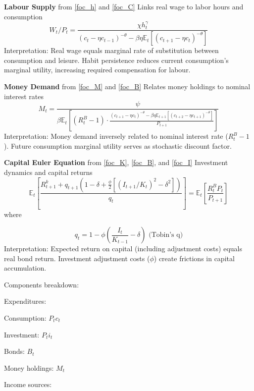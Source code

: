 \documentclass[11pt,preprint]{elsarticle}
\numberwithin{equation}{section}
\numberwithin{figure}{section}
\numberwithin{table}{section}
\begin{document}
\textbf{Labour Supply} from \ref{foc_h} and \ref{foc_C} Links real wage
to labor hours and consumption \begin{equation}\label{reduced_h}
W_t / P_t = \frac{\chi h_t^{\gamma}}
                   {(c_t - \eta c_{t-1})^{-\theta} - \beta\eta \mathbb{E}_t[(c_{t+1} - \eta c_t)^{-\theta}]}
\end{equation} Interpretation: Real wage equals marginal rate of
substitution between consumption and leisure. Habit persistence reduces
current consumption's marginal utility, increasing required compensation
for labour.

\textbf{Money Demand} from \ref{foc_M} and \ref{foc_B} Relates money
holdings to nominal interest rates \begin{equation}\label{reduced_M}
M_t = \frac{\psi}
             {\beta \mathbb{E}_t \left[ (R^B_t - 1) \cdot \frac{(c_{t+1} - \eta c_t)^{-\theta} - \beta\eta \mathbb{E}_{t+1}[(c_{t+2} - \eta c_{t+1})^{-\theta}]}{P_{t+1}} \right]}
\end{equation} Interpretation: Money demand inversely related to nominal
interest rate (\(R^B_t - 1\)). Future consumption marginal utility
serves as stochastic discount factor.

\textbf{Capital Euler Equation} from \ref{foc_K}, \ref{foc_B}, and
\ref{foc_I} Investment dynamics and capital returns
\begin{equation}\label{reduced_K}
\mathbb{E}_t \left[ \frac{R^k_{t+1} + q_{t+1}(1-\delta + \tfrac{\phi}{2}[(I_{t+1}/K_t)^2 - \delta^2])}
                   {q_t} \right]
= \mathbb{E}_t \left[ \frac{R^B_t P_t}{P_{t+1}} \right]
\end{equation} where

\begin{equation}
q_t = 1 - \phi \left( \frac{I_t}{K_{t-1}} - \delta \right)
\text{ (Tobin's q)}
\end{equation} Interpretation: Expected return on capital (including
adjustment costs) equals real bond return. Investment adjustment costs
(\(\phi\)) create frictions in capital accumulation.

\newpage

Components breakdown:

Expenditures:

Consumption: \(P_t c_t\)

Investment: \(P_t i_t\)

Bonds: \(B_t\)

Money holdings: \(M_t\)

Income sources:
\end{document}

